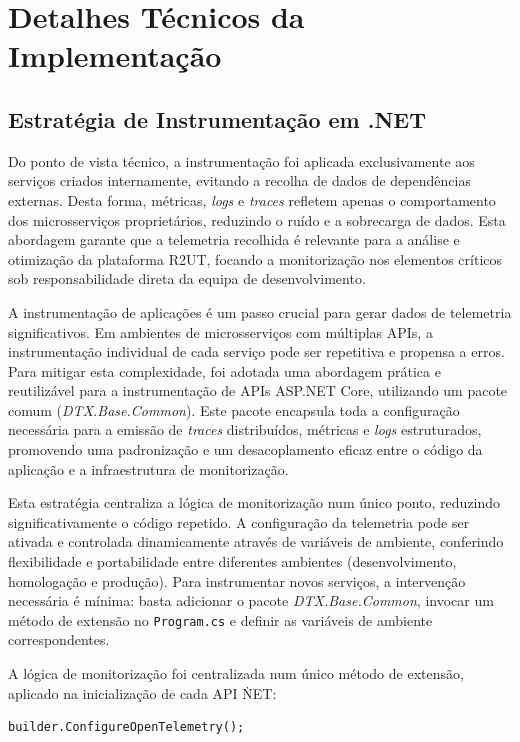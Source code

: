 \section{Detalhes Técnicos da Implementação}

\subsection{Estratégia de Instrumentação em .NET}

Do ponto de vista técnico, a instrumentação foi aplicada exclusivamente aos serviços criados internamente, evitando a recolha de dados de dependências externas. Desta forma, métricas, \textit{logs} e \textit{traces} refletem apenas o comportamento dos microsserviços proprietários, reduzindo o ruído e a sobrecarga de dados. Esta abordagem garante que a telemetria recolhida é relevante para a análise e otimização da plataforma R2UT, focando a monitorização nos elementos críticos sob responsabilidade direta da equipa de desenvolvimento.

A instrumentação de aplicações é um passo crucial para gerar dados de telemetria significativos. Em ambientes de microsserviços com múltiplas APIs, a instrumentação individual de cada serviço pode ser repetitiva e propensa a erros. Para mitigar esta complexidade, foi adotada uma abordagem prática e reutilizável para a instrumentação de APIs ASP.NET Core, utilizando um pacote comum (\textit{DTX.Base.Common}). Este pacote encapsula toda a configuração necessária para a emissão de \textit{traces} distribuídos, métricas e \textit{logs} estruturados, promovendo uma padronização e um desacoplamento eficaz entre o código da aplicação e a infraestrutura de monitorização.

Esta estratégia centraliza a lógica de monitorização num único ponto, reduzindo significativamente o código repetido. A configuração da telemetria pode ser ativada e controlada dinamicamente através de variáveis de ambiente, conferindo flexibilidade e portabilidade entre diferentes ambientes (desenvolvimento, homologação e produção). Para instrumentar novos serviços, a intervenção necessária é mínima: basta adicionar o pacote \textit{DTX.Base.Common}, invocar um método de extensão no \texttt{Program.cs} e definir as variáveis de ambiente correspondentes.

A lógica de monitorização foi centralizada num único método de extensão, aplicado na inicialização de cada API \.NET:

\begin{verbatim}
builder.ConfigureOpenTelemetry();
\end{verbatim}

